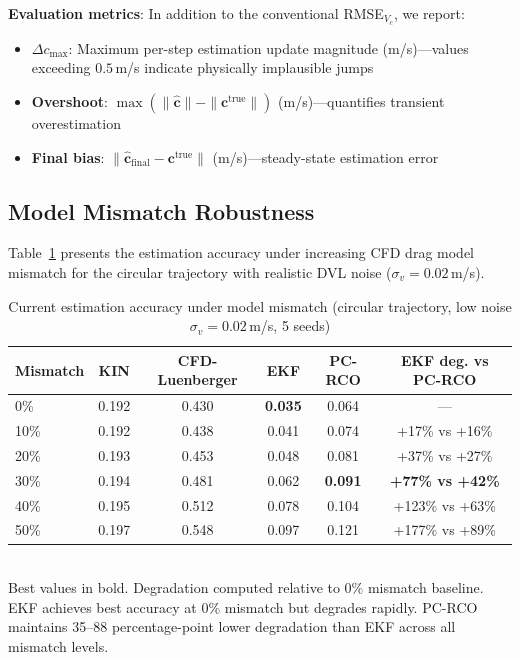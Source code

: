 \textbf{Evaluation metrics}: In addition to the conventional RMSE$_{V_c}$, we report:
\begin{itemize}[itemsep=0pt,topsep=4pt]
    \item \textbf{$\Delta c_{\max}$}: Maximum per-step estimation update magnitude (m/s)---values exceeding $0.5$\,m/s indicate physically implausible jumps
    \item \textbf{Overshoot}: $\max(\|\hat{\bm{c}}\| - \|\bm{c}^{\text{true}}\|)$ (m/s)---quantifies transient overestimation
    \item \textbf{Final bias}: $\|\hat{\bm{c}}_{\text{final}} - \bm{c}^{\text{true}}\|$ (m/s)---steady-state estimation error
\end{itemize}

\subsection{Model Mismatch Robustness}

Table~\ref{tab:accuracy} presents the estimation accuracy under increasing CFD drag model mismatch for the circular trajectory with realistic DVL noise ($\sigma_v=0.02$\,m/s).

\begin{table}[h]
\centering
\caption{Current estimation accuracy under model mismatch (circular trajectory, low noise $\sigma_v=0.02$\,m/s, 5 seeds)}
\label{tab:accuracy}
\begin{tabular}{lccccc}
\toprule
Mismatch & KIN & CFD-Luenberger & EKF & PC-RCO & EKF deg. vs PC-RCO \\
\midrule
0\%   & 0.192 & 0.430 & \textbf{0.035} & 0.064 & --- \\
10\%  & 0.192 & 0.438 & 0.041 & 0.074 & +17\% vs +16\% \\
20\%  & 0.193 & 0.453 & 0.048 & 0.081 & +37\% vs +27\% \\
30\%  & 0.194 & 0.481 & 0.062 & \textbf{0.091} & \textbf{+77\% vs +42\%} \\
40\%  & 0.195 & 0.512 & 0.078 & 0.104 & +123\% vs +63\% \\
50\%  & 0.197 & 0.548 & 0.097 & 0.121 & +177\% vs +89\% \\
\bottomrule
\end{tabular}
\\[4pt]
\footnotesize{Best values in bold. Degradation computed relative to 0\% mismatch baseline. EKF achieves best accuracy at 0\% mismatch but degrades rapidly. PC-RCO maintains 35--88 percentage-point lower degradation than EKF across all mismatch levels.}
\end{table}

